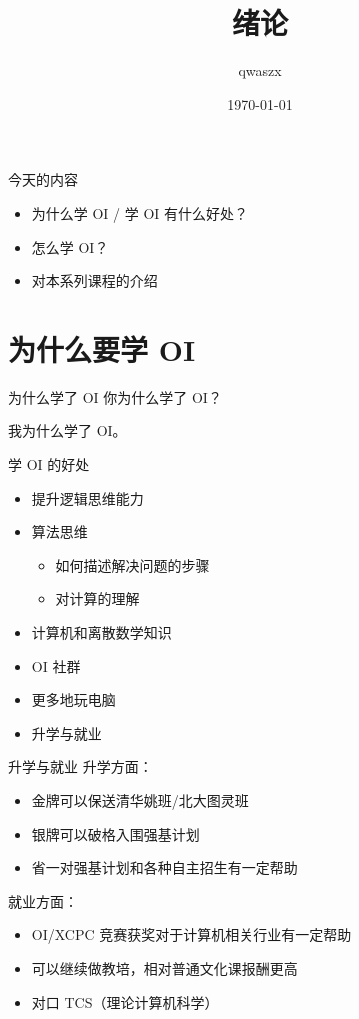 \documentclass[11pt,aspectratio=169]{beamer}
\title{绪论}
\author{qwaszx}
\date{\today}
\begin{document}
\begin{frame}
  \titlepage
\end{frame}

\begin{frame}{今天的内容}
\begin{itemize}
    \item 为什么学 OI / 学 OI 有什么好处？
    \item 怎么学 OI？
    \item 对本系列课程的介绍
\end{itemize}
\end{frame}

\section{为什么要学 OI}

\begin{frame}{为什么学了 OI}
    你为什么学了 OI？

    \pause
    我为什么学了 OI。
\end{frame}

\begin{frame}{学 OI 的好处}
\begin{itemize}
    \item 提升逻辑思维能力
    \item 算法思维
    \begin{itemize}
        \item 如何描述解决问题的步骤
        \item 对计算的理解
    \end{itemize}
    \item 计算机和离散数学知识
    \item OI 社群
    \item 更多地玩电脑
    \item 升学与就业
\end{itemize}
\end{frame}

\begin{frame}{升学与就业}
升学方面：
    \begin{itemize}
        \item 金牌可以保送清华姚班/北大图灵班
        \item 银牌可以破格入围强基计划
        \item 省一对强基计划和各种自主招生有一定帮助 
    \end{itemize}
就业方面：
    \begin{itemize}
        \item OI/XCPC 竞赛获奖对于计算机相关行业有一定帮助
        \item 可以继续做教培，相对普通文化课报酬更高
        \item 对口 TCS（理论计算机科学）
    \end{itemize}
\end{frame}
\end{document}
